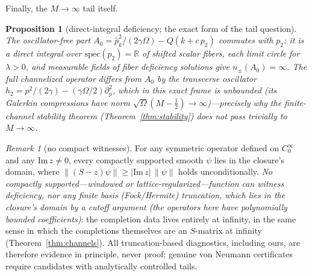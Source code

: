 \documentclass[11pt]{article}
\newtheorem{proposition}[theorem]{Proposition}
\theoremstyle{definition}
\theoremstyle{remark}
\newtheorem{remark}[theorem]{Remark}
\newcommand{\norm}[1]{\left\lVert #1 \right\rVert}
\begin{document}
Finally, the $M\to\infty$ tail itself.

\begin{proposition}[direct-integral deficiency; the exact form of the
tail question]
\label{prop:directintegral}
The oscillator-free part $A_0=\hat p_k^{2}/(2\gamma\Omega)-Q(k+c\,p_2)$
commutes with $p_2$: it is a direct \emph{integral} over
$\mathrm{spec}(p_2)=\mathbb R$ of shifted scalar fibers, each limit
circle for $\lambda>0$, and measurable fields of fiber deficiency
solutions give $n_\pm(A_0)=\infty$. The full channelized operator differs
from $A_0$ by the transverse oscillator
$h_2=p^{2}/(2\gamma)-(\gamma\Omega/2)\partial_p^{2}$, which in this
exact frame is \emph{unbounded} (its Galerkin compressions have norm
$\sqrt\Omega(M-\tfrac12)\to\infty$)---precisely why the finite-channel
stability theorem (Theorem~\ref{thm:stability}) does not pass trivially
to $M\to\infty$.
\end{proposition}

\begin{remark}[no compact witnesses]
\label{rem:nocompact}
For any symmetric operator defined on $C_0^{\infty}$ and any
$\mathrm{Im}\,z\ne0$, every compactly supported smooth $\psi$ lies in
the closure's domain, where
$\norm{(S-z)\psi}\ge|\mathrm{Im}\,z|\,\norm{\psi}$ holds
unconditionally. \emph{No compactly supported---windowed or
lattice-regularized---function can witness deficiency, nor any finite
basis (Fock/Hermite) truncation, which lies in the closure's domain by
a cutoff argument (the operators here have polynomially bounded coefficients)}:
the completion data lives entirely at infinity, in the same sense in
which the completions themselves are an $S$-matrix at infinity
(Theorem~\ref{thm:channels}). All truncation-based diagnostics,
including ours, are therefore evidence in principle, never proof;
genuine von Neumann certificates require candidates with analytically
controlled tails.
\end{remark}
\end{document}
